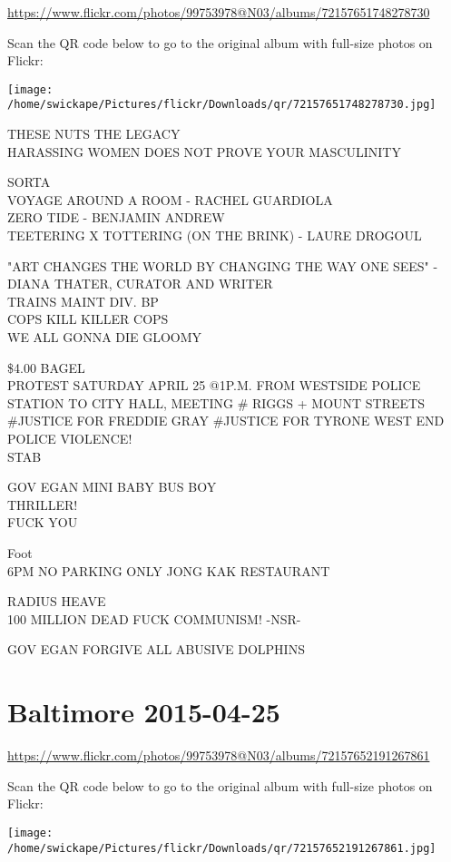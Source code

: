 \documentclass[10pt,letterpaper]{article}
\begin{document}
\url{https://www.flickr.com/photos/99753978@N03/albums/72157651748278730}

Scan the QR code below to go to the original album with full-size photos on Flickr:

\texttt{[image: /home/swickape/Pictures/flickr/Downloads/qr/72157651748278730.jpg]}


THESE NUTS THE LEGACY\\
HARASSING WOMEN DOES NOT PROVE YOUR MASCULINITY

SORTA\\
VOYAGE AROUND A ROOM {-} RACHEL GUARDIOLA\\
ZERO TIDE {-} BENJAMIN ANDREW\\
TEETERING X TOTTERING (ON THE BRINK) {-} LAURE DROGOUL

"ART CHANGES THE WORLD BY CHANGING THE WAY ONE SEES" {-} DIANA THATER, CURATOR AND WRITER\\
TRAINS MAINT DIV. BP\\
COPS KILL KILLER COPS\\
WE ALL GONNA DIE GLOOMY

\$4.00 BAGEL\\
PROTEST SATURDAY APRIL 25 @1P.M. FROM WESTSIDE POLICE STATION TO CITY HALL, MEETING \# RIGGS + MOUNT STREETS\\
\#JUSTICE FOR FREDDIE GRAY \#JUSTICE FOR TYRONE WEST END POLICE VIOLENCE!\\
STAB

GOV EGAN MINI BABY BUS BOY\\
THRILLER!\\
FUCK YOU

Foot\\
6PM NO PARKING ONLY JONG KAK RESTAURANT

RADIUS HEAVE\\
100 MILLION DEAD FUCK COMMUNISM!  {-}NSR{-}

GOV EGAN FORGIVE ALL ABUSIVE DOLPHINS


\section*{Baltimore 2015-04-25}

\url{https://www.flickr.com/photos/99753978@N03/albums/72157652191267861}

Scan the QR code below to go to the original album with full-size photos on Flickr:

\texttt{[image: /home/swickape/Pictures/flickr/Downloads/qr/72157652191267861.jpg]}
\end{document}
